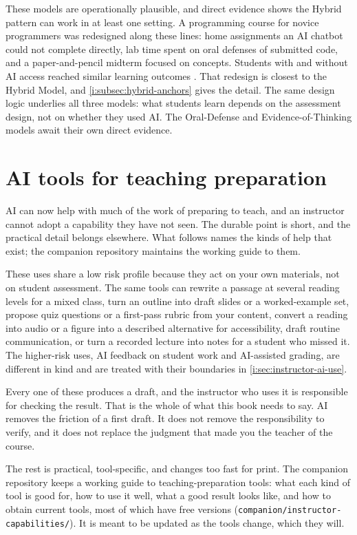 \documentclass{SIAMbook2023}
\begin{document}
These models are operationally plausible, and direct evidence shows the Hybrid pattern can work in at least one setting. A programming course for novice programmers was redesigned along these lines: home assignments an AI chatbot could not complete directly, lab time spent on oral defenses of submitted code, and a paper-and-pencil midterm focused on concepts. Students with and without AI access reached similar learning outcomes \citep{kosar2024computer}. That redesign is closest to the Hybrid Model, and \cref{i:subsec:hybrid-anchors} gives the detail. The same design logic underlies all three models: what students learn depends on the assessment design, not on whether they used AI. The Oral-Defense and Evidence-of-Thinking models await their own direct evidence.

\section{AI tools for teaching preparation}
\label{i:sec:prep-capabilities}

AI can now help with much of the work of preparing to teach, and an instructor cannot adopt a capability
they have not seen. The durable point is short, and the practical detail belongs elsewhere. What follows
names the kinds of help that exist; the companion repository maintains the working guide to them.

These uses share a low risk profile because they act on your own materials, not on student assessment.
The same tools can rewrite a passage at several reading levels for a mixed class, turn an outline into
draft slides or a worked-example set, propose quiz questions or a first-pass rubric from your content,
convert a reading into audio or a figure into a described alternative for accessibility, draft routine
communication, or turn a recorded lecture into notes for a student who missed it. The higher-risk uses,
AI feedback on student work and AI-assisted grading, are different in kind and are treated with their
boundaries in \cref{i:sec:instructor-ai-use}.

Every one of these produces a draft, and the instructor who uses it is responsible for checking the
result. That is the whole of what this book needs to say. AI removes the friction of a first draft. It
does not remove the responsibility to verify, and it does not replace the judgment that made you the
teacher of the course.

The rest is practical, tool-specific, and changes too fast for print. The companion repository keeps a
working guide to teaching-preparation tools: what each kind of tool is good for, how to use it well, what
a good result looks like, and how to obtain current tools, most of which have free versions
(\texttt{companion/instructor-capabilities/}). It is meant to be updated as the tools change, which they
will.
\end{document}
